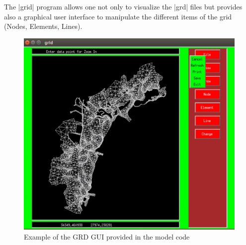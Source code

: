 
%
%
%
%
%
%
%

The |grid| program allows one not only to visualize 
the |grd| files but provides also a graphical user interface 
to manipulate the different items of the grid (Nodes, Elements, Lines).

\begin{figure}[htbp]
\centering
\includegraphics[scale=0.5]{grd.png}
\caption{Example of the GRD GUI provided in the model code}
\label{grd_gui}
\end{figure}

